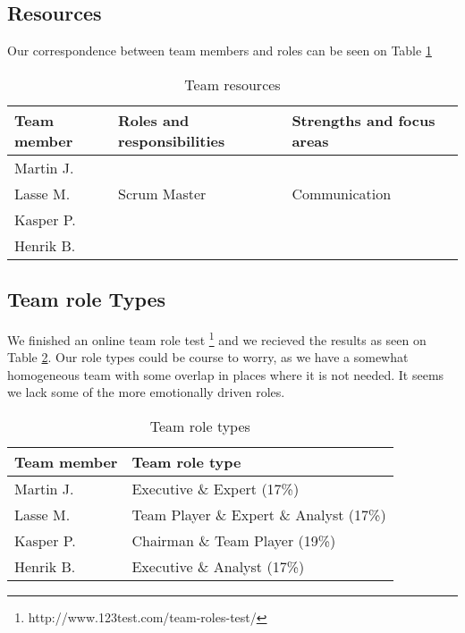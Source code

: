 \subsection{Resources}
Our correspondence between team members and roles can be seen on Table 
\ref{tab:resources}


\begin{table}[!ht]
    \centering
    \begin{tabular}{l|l|l}
        \rowcolor{Gray}
        \textbf{Team member} & \textbf{Roles and responsibilities} & \textbf{Strengths and focus areas}\\\hline
        Martin J.            &&\\
        Lasse M.             & Scrum Master & Communication\\
        Kasper P.            & &\\
        Henrik B.            & &
    \end{tabular}
    \caption{Team resources}
    \label{tab:resources}
\end{table}

\subsection{Team role Types}
We finished an online team role test \footnote{http://www.123test.com/team-roles-test/} and we recieved the results as seen on 
Table \ref{tab:roleTypes}. Our role types could be course to worry, as we have a somewhat homogeneous team with some overlap in places where
it is not needed. It seems we lack some of the more emotionally driven roles.
\begin{table}[!ht]
    \centering
    \begin{tabular}{l|l}
        \rowcolor{Gray}
        \textbf{Team member} & \textbf{Team role type}\\\hline
        Martin J.            & Executive \& Expert (17\%) \\
        Lasse M.             & Team Player \& Expert \& Analyst (17\%) \\
        Kasper P.            & Chairman \& Team Player (19\%) \\
        Henrik B.            & Executive \& Analyst (17\%)
    \end{tabular}
    \caption{Team role types}
    \label{tab:roleTypes}
\end{table}
